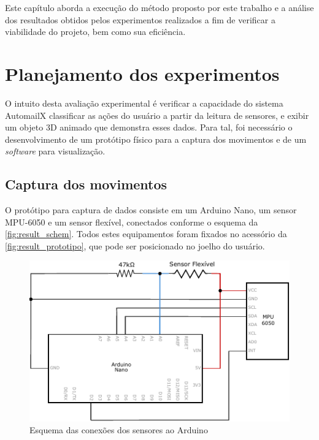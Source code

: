 Este capítulo aborda a execução do método proposto por este trabalho e a análise dos resultados obtidos pelos experimentos realizados a fim de verificar a viabilidade do projeto, bem como sua eficiência.

\section{Planejamento dos experimentos}\label{sec:result_planejamento}
O intuito desta avaliação experimental é verificar a capacidade do sistema AutomailX classificar as ações do usuário a partir da leitura de sensores, e exibir um objeto 3D animado que demonstra esses dados. Para tal, foi necessário o desenvolvimento de um protótipo físico para a captura dos movimentos e de um \textit{software} para visualização.

\subsection{Captura dos movimentos}\label{sec:result_captura}
O protótipo para captura de dados consiste em um Arduino Nano, um sensor MPU-6050 e um sensor flexível, conectados conforme o esquema da \autoref{fig:result_schem}. Todos estes equipamentos foram fixados no acessório da \autoref{fig:result_prototipo}, que pode ser posicionado no joelho do usuário.

\begin{figure}[ht]
	\caption{\label{fig:result_schem}Esquema das conexões dos sensores ao Arduino}
	\begin{center}
	    \includegraphics[width=.8\textwidth]{resources/result_schem}
	\end{center}
\end{figure}

